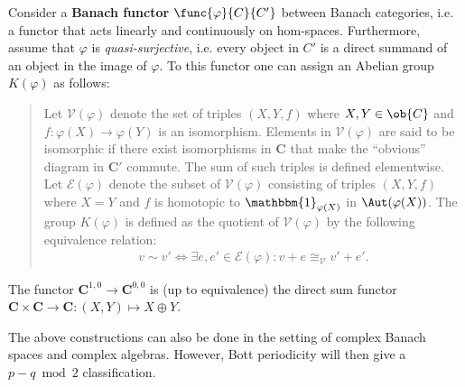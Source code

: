     \begin{construct}\label{clifford:functor_k_group}
        Consider a \textbf{Banach functor} $\func{\varphi}{C}{C'}$ between Banach categories, i.e. a functor that acts linearly and continuously on hom-spaces. Furthermore, assume that $\varphi$ is \textit{quasi-surjective}, i.e. every object in $C'$ is a direct summand of an object in the image of $\varphi$. To this functor one can assign an Abelian group $K(\varphi)$ as follows:
        \begin{quote}
            Let $\mathscr{V}(\varphi)$ denote the set of triples $(X,Y,f)$ where $X,Y\in\ob{C}$ and $f:\varphi(X)\rightarrow\varphi(Y)$ is an isomorphism. Elements in $\mathscr{V}(\varphi)$ are said to be isomorphic if there exist isomorphisms in $\mathbf{C}$ that make the ``obvious'' diagram in $\mathbf{C'}$ commute. The sum of such triples is defined elementwise. Let $\mathscr{E}(\varphi)$ denote the subset of $\mathscr{V}(\varphi)$ consisting of triples $(X,Y,f)$ where $X=Y$ and $f$ is homotopic to $\mathbbm{1}_{\varphi(X)}$ in $\Aut(\varphi(X))$. The group $K(\varphi)$ is defined as the quotient of $\mathscr{V}(\varphi)$ by the following equivalence relation:
            \begin{gather}
                v\sim v'\iff\exists e,e'\in\mathscr{E}(\varphi):v+e\cong_{\mathscr{V}} v'+e'.
            \end{gather}
        \end{quote}
    \end{construct}

    \begin{example}[$K^{0,0}(\mathbf{C})$]\label{clifford:k00}
        The functor $\mathbf{C}^{1,0}\rightarrow\mathbf{C}^{0,0}$ is (up to equivalence) the direct sum functor $\mathbf{C}\times\mathbf{C}\rightarrow\mathbf{C}:(X,Y)\mapsto X\oplus Y$.
    \end{example}

    \begin{remark}\label{clifford:complex_bott_periodicity}
        The above constructions can also be done in the setting of complex Banach spaces and complex algebras. However, Bott periodicity will then give a $p-q\bmod2$ classification.
    \end{remark}

